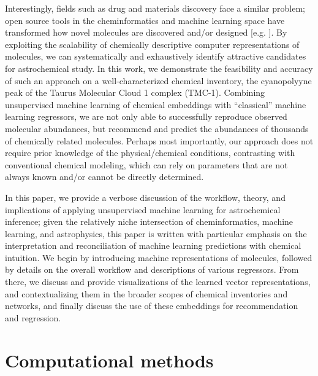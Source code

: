 \documentclass[twocolumn]{aastex63}
\begin{document}

Interestingly, fields such as drug and materials discovery face a similar problem; open source tools in the cheminformatics and machine learning space have transformed how novel molecules are discovered and/or designed [e.g. \citep{janet_machine_2020,kulik_making_2020,david_molecular_2020}]. By exploiting the scalability of chemically descriptive computer representations of molecules, we can systematically and exhaustively identify attractive candidates for astrochemical study. In this work, we demonstrate the feasibility and accuracy of such an approach on a well-characterized chemical inventory, the cyanopolyyne peak of the Taurus Molecular Cloud 1 complex (TMC-1). Combining unsupervised machine learning of chemical embeddings with ``classical'' machine learning regressors, we are not only able to successfully reproduce observed molecular abundances, but recommend and predict the abundances of thousands of chemically related molecules. Perhaps most importantly, our approach does not require prior knowledge of the physical/chemical conditions, contrasting with conventional chemical modeling, which can rely on parameters that are not always known and/or cannot be directly determined. 

In this paper, we provide a verbose discussion of the workflow, theory, and implications of applying unsupervised machine learning for astrochemical inference; given the relatively niche intersection of cheminformatics, machine learning, and astrophysics, this paper is written with particular emphasis on the interpretation and reconciliation of machine learning predictions with chemical intuition. We begin by introducing machine representations of molecules, followed by details on the overall workflow and descriptions of various regressors. From there, we discuss and provide visualizations of the learned vector representations, and contextualizing them in the broader scopes of chemical inventories and networks, and finally discuss the use of these embeddings for recommendation and regression. 

\section{Computational methods}
\end{document}

